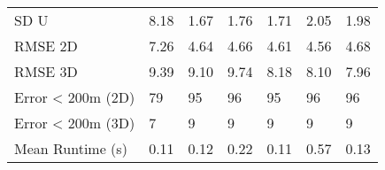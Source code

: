 \begin{longtable}{lllllll}
SD U              &       8.18 &       1.67 &      1.76 &     1.71 &     2.05 &        1.98 \\
RMSE 2D           &       7.26 &       4.64 &      4.66 &     4.61 &     4.56 &        4.68 \\
RMSE 3D           &       9.39 &       9.10 &      9.74 &     8.18 &     8.10 &        7.96 \\
Error < 200m (2D) &         79 &         95 &        96 &       95 &       96 &          96 \\
Error < 200m (3D) &          7 &          9 &         9 &        9 &        9 &           9 \\
Mean Runtime (s)  &       0.11 &       0.12 &      0.22 &     0.11 &     0.57 &        0.13 \\
\end{longtable}
